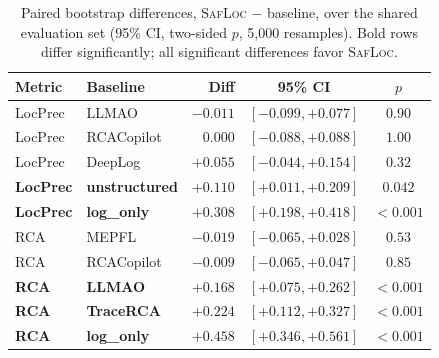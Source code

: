 \documentclass[runningheads]{llncs}
\begin{document}
\begin{table}[t]
  \centering
  \caption{Paired bootstrap differences, \textsc{SafLoc} $-$ baseline, over the shared evaluation set (95\% CI, two-sided $p$, 5{,}000 resamples). Bold rows differ significantly; all significant differences favor \textsc{SafLoc}.}
  \label{tab:sig}
  \setlength{\tabcolsep}{5pt}
  \footnotesize
  \begin{tabular}{llrcc}
    \toprule
    Metric & Baseline & Diff & 95\% CI & $p$ \\
    \midrule
    LocPrec & LLMAO & $-0.011$ & $[-0.099,+0.077]$ & $0.90$ \\
    LocPrec & RCACopilot & $0.000$ & $[-0.088,+0.088]$ & $1.00$ \\
    LocPrec & DeepLog & $+0.055$ & $[-0.044,+0.154]$ & $0.32$ \\
    \textbf{LocPrec} & \textbf{unstructured} & $\mathbf{+0.110}$ & $\mathbf{[+0.011,+0.209]}$ & $\mathbf{0.042}$ \\
    \textbf{LocPrec} & \textbf{log\_only} & $\mathbf{+0.308}$ & $\mathbf{[+0.198,+0.418]}$ & $\mathbf{<0.001}$ \\
    RCA & MEPFL & $-0.019$ & $[-0.065,+0.028]$ & $0.53$ \\
    RCA & RCACopilot & $-0.009$ & $[-0.065,+0.047]$ & $0.85$ \\
    \textbf{RCA} & \textbf{LLMAO} & $\mathbf{+0.168}$ & $\mathbf{[+0.075,+0.262]}$ & $\mathbf{<0.001}$ \\
    \textbf{RCA} & \textbf{TraceRCA} & $\mathbf{+0.224}$ & $\mathbf{[+0.112,+0.327]}$ & $\mathbf{<0.001}$ \\
    \textbf{RCA} & \textbf{log\_only} & $\mathbf{+0.458}$ & $\mathbf{[+0.346,+0.561]}$ & $\mathbf{<0.001}$ \\
    \bottomrule
  \end{tabular}
\end{table}
\end{document}
